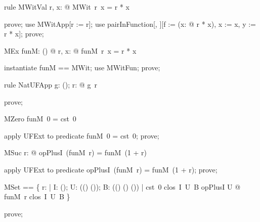 \documentclass{article}
\begin{document}
\begin{theorem}{rule MWitVal}
  \forall r, x: \nat @ MWit~r~x = r * x
\end{theorem}

\begin{zproof}
prove;
use MWitApp[r := r];
use pairInFunction[\nat, \nat][f := (\lambda x: \nat @ r * x), x := x, y := r * x];
prove;
\end{zproof}

\begin{theorem}{MEx}
  \exists funM: \nat \fun (\nat \fun \nat) @ \forall r, x: \nat @ funM~r~x = r * x
\end{theorem}

\begin{zproof}
instantiate funM == MWit;
use MWitFun;
prove;
\end{zproof}

\begin{theorem}{rule NatUFApp}
  \forall g: \nat \fun (\nat \fun \nat); r: \nat @ g~r \in \nat \fun \nat
\end{theorem}

\begin{zproof}
prove;
\end{zproof}

\begin{theorem}{MZero}
  funM~0 = cst~0
\end{theorem}

\begin{zproof}
apply UFExt to predicate funM~0 = cst~0;
prove;
\end{zproof}

\begin{theorem}{MSuc}
  \forall r: \nat @ opPlusI~(funM~r) = funM~(1 + r)
\end{theorem}

\begin{zproof}
apply UFExt to predicate opPlusI~(funM~r) = funM~(1 + r);
prove;
\end{zproof}

\begin{zed}
  MSet == \{ r: \nat | \forall I: \power (\nat \fun \nat); U: \power ((\nat \fun \nat) \fun (\nat \fun \nat)); B: \power ((\nat \fun \nat) \cross (\nat \fun \nat) \fun (\nat \fun \nat)) | cst~0 \in clos~I~U~B \land opPlusI \in U @
    funM~r \in clos~I~U~B \}
\end{zed}

\begin{zproof}
prove;
\end{zproof}
\end{document}
